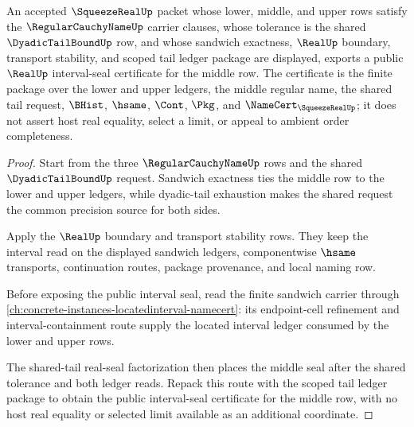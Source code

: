 \begin{theorem}
\label{thm:squeeze-real-public-interval-seal-export}
An accepted $\SqueezeRealUp$ packet whose lower, middle, and upper rows satisfy the $\RegularCauchyNameUp$ carrier clauses, whose tolerance is the shared $\DyadicTailBoundUp$ row, and whose sandwich exactness, $\RealUp$ boundary, transport stability, and scoped tail ledger package are displayed, exports a public $\RealUp$ interval-seal certificate for the middle row. The certificate is the finite package over the lower and upper ledgers, the middle regular name, the shared tail request, $\BHist$, $\hsame$, $\Cont$, $\Pkg$, and $\NameCert_{\SqueezeRealUp}$; it does not assert host real equality, select a limit, or appeal to ambient order completeness.
\end{theorem}
\begin{proof}
Start from the three $\RegularCauchyNameUp$ rows and the shared $\DyadicTailBoundUp$ request. Sandwich exactness ties the middle row to the lower and upper ledgers, while dyadic-tail exhaustion makes the shared request the common precision source for both sides.

Apply the $\RealUp$ boundary and transport stability rows. They keep the interval read on the displayed sandwich ledgers, componentwise $\hsame$ transports, continuation routes, package provenance, and local naming row.

Before exposing the public interval seal, read the finite sandwich carrier through \autoref{ch:concrete-instances-locatedinterval-namecert}: its endpoint-cell refinement and interval-containment route supply the located interval ledger consumed by the lower and upper rows.

The shared-tail real-seal factorization then places the middle seal after the shared tolerance and both ledger reads. Repack this route with the scoped tail ledger package to obtain the public interval-seal certificate for the middle row, with no host real equality or selected limit available as an additional coordinate.
\end{proof}


